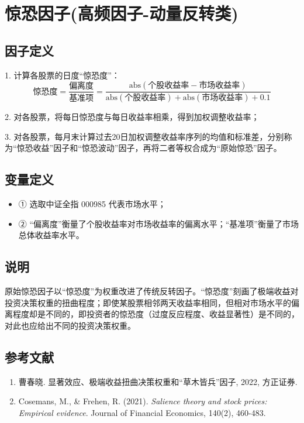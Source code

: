 \documentclass{article}
\begin{document}
\section{惊恐因子(高频因子-动量反转类)}

\subsection{因子定义}

1. 计算各股票的日度“惊恐度”：
\begin{equation}
    \text{惊恐度} = \frac{\text{偏离度}}{\text{基准项}} = \frac{\mathrm{abs}(\text{个股收益率} - \text{市场收益率})}{\mathrm{abs}(\text{个股收益率}) + \mathrm{abs}(\text{市场收益率}) + 0.1}
\end{equation}

2. 对各股票，将每日惊恐度与每日收益率相乘，得到加权调整收益率；

3. 对各股票，每月末计算过去20日加权调整收益率序列的均值和标准差，分别称为“惊恐收益”因子和“惊恐波动”因子，再将二者等权合成为“原始惊恐”因子。

\subsection{变量定义}
\begin{itemize}
    \item ① 选取中证全指 000985 代表市场水平；
    \item ② “偏离度”衡量了个股收益率对市场收益率的偏离水平；“基准项”衡量了市场总体收益率水平。
\end{itemize}

\subsection{说明}
原始惊恐因子以“惊恐度”为权重改进了传统反转因子。“惊恐度”刻画了极端收益对投资决策权重的扭曲程度；即使某股票相邻两天收益率相同，但相对市场水平的偏离程度却是不同的，即投资者的惊恐度（过度反应程度、收益显著性）是不同的，对此也应给出不同的投资决策权重。

\subsection{参考文献}
\begin{enumerate}
    \item 曹春晓. 显著效应、极端收益扭曲决策权重和“草木皆兵”因子, 2022, 方正证券.
    \item Cosemans, M., \& Frehen, R. (2021). \textit{Salience theory and stock prices: Empirical evidence}. Journal of Financial Economics, 140(2), 460-483.
\end{enumerate}
\end{document}
